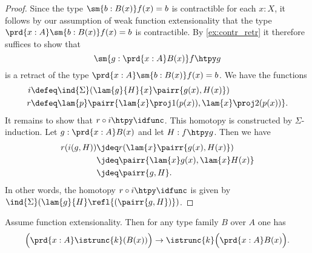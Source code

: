 \begin{proof}
Since the type $\sm{b:B(x)}f(x)=b$ is contractible for each $x:X$, it follows by our assumption of weak function extensionality that the type $\prd{x:A}\sm{b:B(x)}f(x)=b$ is contractible. By \autoref{ex:contr_retr} it therefore suffices to show that
\begin{equation*}
\sm{g:\prd{x:A}B(x)}f\htpy g
\end{equation*}
is a retract of the type $\prd{x:A}\sm{b:B(x)}f(x)=b$. We have the functions
\begin{align*}
i & \defeq \ind{\Sigma}(\lam{g}{H}{x}\pairr{g(x),H(x)}) \\
r & \defeq \lam{p}\pairr{\lam{x}\proj 1(p(x)),\lam{x}\proj 2(p(x))}.
\end{align*}
It remains to show that $r\circ i\htpy \idfunc$. This homotopy is constructed by $\Sigma$-induction. Let $g:\prd{x:A}B(x)$ and let $H:f\htpy g$. Then we have
\begin{align*}
r(i(g,H)) & \jdeq r(\lam{x}\pairr{g(x),H(x)}) \\
& \jdeq \pairr{\lam{x}g(x),\lam{x}H(x)} \\
& \jdeq \pairr{g,H}.
\end{align*}
In other words, the homotopy $r\circ i\htpy \idfunc$ is given by $\ind{\Sigma}(\lam{g}{H}\refl{(\pairr{g,H})})$. 
\end{proof}

\begin{comment}
\begin{rmk}
Since we assumed the $\eta$-rule for $\Sigma$-types, we also have
\begin{align*}
\mathsf{pi\usc{}sigma}(\mathsf{sigma\usc{}pi}(p)) & \jdeq \mathsf{pi\usc{}sigma}(\pairr{\lam{x}\proj 1(p(x)),\lam{x}\proj 2(p(x))}) \\
& \jdeq \lam{x}\pairr{\proj 1(p(x)),\proj 2(p(x))} \\
& \jdeq \lam{x} p(x) \\
& \jdeq p.
\end{align*}
Therefore, the types $\sum_g f\htpy g$ and $\prod_x\sum_b f(x)=b$ are actually \emph{judgmentally isomorphic}. 
\end{rmk}
\end{comment}

\begin{thm}
Assume function extensionality. Then for any type family $B$ over $A$ one has
\begin{equation*}
\Big(\prd{x:A}\istrunc{k}(B(x))\Big)\to \istrunc{k}\Big(\prd{x:A}B(x)\Big).
\end{equation*}
\end{thm}

